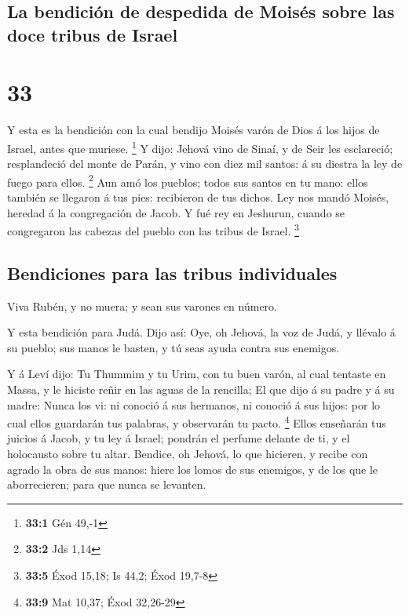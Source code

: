 \hypertarget{la-bendiciuxf3n-de-despedida-de-moisuxe9s-sobre-las-doce-tribus-de-israel}{%
\subsection{La bendición de despedida de Moisés sobre las doce tribus de
Israel}\label{la-bendiciuxf3n-de-despedida-de-moisuxe9s-sobre-las-doce-tribus-de-israel}}

\hypertarget{section-32}{%
\section{33}\label{section-32}}

 Y esta es la bendición con la cual bendijo Moisés varón
de Dios á los hijos de Israel, antes que muriese. \footnote{\textbf{33:1}
  Gén 49,-1}  Y dijo: Jehová vino de Sinaí, y de Seir les
esclareció; resplandeció del monte de Parán, y vino con diez mil santos:
á su diestra la ley de fuego para ellos. \footnote{\textbf{33:2} Jds
  1,14}  Aun amó los pueblos; todos sus santos en tu mano:
ellos también se llegaron á tus pies: recibieron de tus dichos.
 Ley nos mandó Moisés, heredad á la congregación de Jacob.
 Y fué rey en Jeshurun, cuando se congregaron las cabezas
del pueblo con las tribus de Israel. \footnote{\textbf{33:5} Éxod 15,18;
  Is 44,2; Éxod 19,7-8}

\hypertarget{bendiciones-para-las-tribus-individuales}{%
\subsection{Bendiciones para las tribus
individuales}\label{bendiciones-para-las-tribus-individuales}}

 Viva Rubén, y no muera; y sean sus varones en número.

 Y esta bendición para Judá. Dijo así: Oye, oh Jehová, la
voz de Judá, y llévalo á su pueblo; sus manos le basten, y tú seas ayuda
contra sus enemigos.

 Y á Leví dijo: Tu Thummim y tu Urim, con tu buen varón,
al cual tentaste en Massa, y le hiciste reñir en las aguas de la
rencilla;  El que dijo á su padre y á su madre: Nunca los
vi: ni conoció á sus hermanos, ni conoció á sus hijos: por lo cual ellos
guardarán tus palabras, y observarán tu pacto. \footnote{\textbf{33:9}
  Mat 10,37; Éxod 32,26-29}  Ellos enseñarán tus juicios
á Jacob, y tu ley á Israel; pondrán el perfume delante de ti, y el
holocausto sobre tu altar.  Bendice, oh Jehová, lo que
hicieren, y recibe con agrado la obra de sus manos: hiere los lomos de
sus enemigos, y de los que le aborrecieren; para que nunca se levanten.

